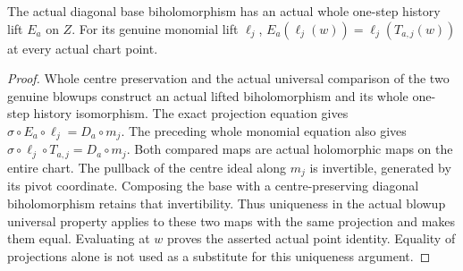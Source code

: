 \begin{theorem}
\label{hir:general-nc-actual-diagonal-lift-chart-identity}
\leanok
{}
The actual diagonal base biholomorphism has an actual whole one-step
history lift $E_a$ on $Z$. For its genuine monomial lift $\ell_j$,
$E_a(\ell_j(w))=\ell_j(T_{a,j}(w))$ at every actual chart point.
\end{theorem}
\begin{proof}
Whole centre preservation and the actual universal comparison of the
two genuine blowups construct an actual lifted biholomorphism and its
whole one-step history isomorphism. The exact projection equation gives
$\sigma\circ E_a\circ\ell_j=D_a\circ m_j$. The preceding whole monomial
equation also gives $\sigma\circ\ell_j\circ T_{a,j}=D_a\circ m_j$.
Both compared maps are actual holomorphic maps on the entire chart.
The pullback of the centre ideal along $m_j$ is invertible, generated
by its pivot coordinate. Composing the base with a centre-preserving
diagonal biholomorphism retains that invertibility. Thus uniqueness in
the actual blowup universal property applies to these two maps with the
same projection and makes them equal. Evaluating at $w$ proves the
asserted actual point identity. Equality of projections alone is not
used as a substitute for this uniqueness argument.
\end{proof}

